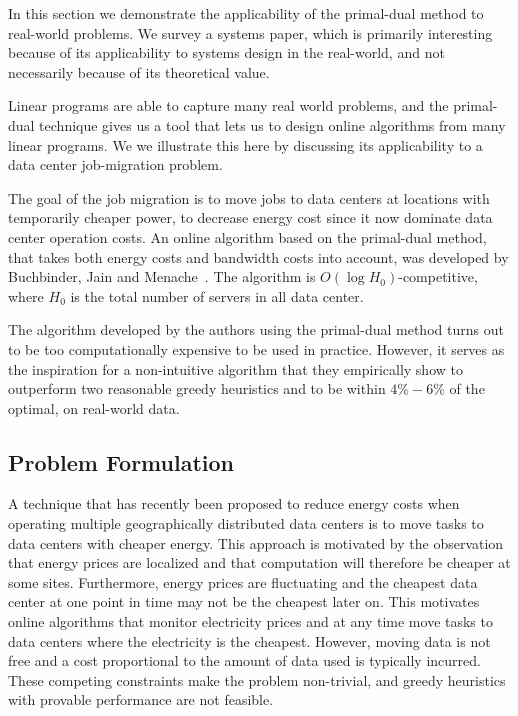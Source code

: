 In this section we demonstrate the applicability of the primal-dual method to real-world problems.
We survey a systems paper, which is primarily interesting because of its applicability to systems design in the real-world, and not necessarily because of its theoretical value.

Linear programs are able to capture many real world problems, and the primal-dual technique gives us a tool that lets us to design online algorithms from many linear programs.
We we illustrate this here by discussing its applicability to a data center job-migration problem.

The goal of the job migration is to move jobs to data centers at locations with temporarily cheaper power, to decrease energy cost since it now dominate data center operation costs.
An online algorithm based on the primal-dual method, that takes both energy costs and bandwidth costs into account, was developed by Buchbinder, Jain and Menache~\cite{buchbinder11:job-migration,buchbinder11:job-migration-techreport}.
The algorithm is $O(\log H_0)$-competitive, where $H_0$ is the total number of servers in all data center.

The algorithm developed by the authors using the primal-dual method turns out to be too computationally expensive to be used in practice.
However, it serves as the inspiration for a non-intuitive algorithm that they empirically show to outperform two reasonable greedy heuristics and to be within $4\%-6\%$ of the optimal, on real-world data.

\subsection{Problem Formulation}

A technique that has recently been proposed to reduce energy costs when operating multiple geographically distributed data centers is to move tasks to data centers with cheaper energy.
This approach is motivated by the observation that energy prices are localized and that computation will therefore be cheaper at some sites.
Furthermore, energy prices are fluctuating and the cheapest data center at one point in time may not be the cheapest later on.
This motivates online algorithms that monitor electricity prices and at any time move tasks to data centers where the electricity is the cheapest.
However, moving data is not free and a cost proportional to the amount of data used is typically incurred.
These competing constraints make the problem non-trivial, and greedy heuristics with provable performance are not feasible.

